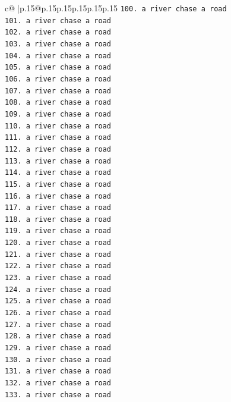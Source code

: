 \documentclass{article}
\begin{document}
{\begin{supertabular}{c@{$\;$}|p{.15\linewidth}@{}p{.15\linewidth}p{.15\linewidth}p{.15\linewidth}p{.15\linewidth}p{.15\linewidth}}
{{{\texttt{100. a river chase a road} \\
\texttt{101. a river chase a road} \\
\texttt{102. a river chase a road} \\
\texttt{103. a river chase a road} \\
\texttt{104. a river chase a road} \\
\texttt{105. a river chase a road} \\
\texttt{106. a river chase a road} \\
\texttt{107. a river chase a road} \\
\texttt{108. a river chase a road} \\
\texttt{109. a river chase a road} \\
\texttt{110. a river chase a road} \\
\texttt{111. a river chase a road} \\
\texttt{112. a river chase a road} \\
\texttt{113. a river chase a road} \\
\texttt{114. a river chase a road} \\
\texttt{115. a river chase a road} \\
\texttt{116. a river chase a road} \\
\texttt{117. a river chase a road} \\
\texttt{118. a river chase a road} \\
\texttt{119. a river chase a road} \\
\texttt{120. a river chase a road} \\
\texttt{121. a river chase a road} \\
\texttt{122. a river chase a road} \\
\texttt{123. a river chase a road} \\
\texttt{124. a river chase a road} \\
\texttt{125. a river chase a road} \\
\texttt{126. a river chase a road} \\
\texttt{127. a river chase a road} \\
\texttt{128. a river chase a road} \\
\texttt{129. a river chase a road} \\
\texttt{130. a river chase a road} \\
\texttt{131. a river chase a road} \\
\texttt{132. a river chase a road} \\
\texttt{133. a river chase a road} \\
}}}
\end{supertabular}}
\end{document}
